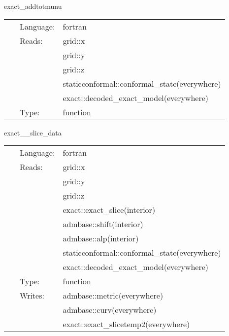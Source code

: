\vspace{5mm}


\hspace{5mm} exact\_addtotmunu 

\hspace{5mm}{\it set stress energy tansor based on exact solution } 


\hspace{5mm}

 \begin{tabular*}{160mm}{cll} 
~ & Language:  & fortran \\ 
~ & Reads:  & grid::x \\ 
~& ~ &grid::y\\ 
~& ~ &grid::z\\ 
~& ~ &staticconformal::conformal\_state(everywhere)\\ 
~& ~ &exact::decoded\_exact\_model(everywhere)\\ 
~ & Type:  & function \\ 
\end{tabular*} 


\vspace{5mm}

\noindent {\bf } 

\hspace{5mm} exact\_\_slice\_data 

\hspace{5mm}{\it  } 


\hspace{5mm}

 \begin{tabular*}{160mm}{cll} 
~ & Language:  & fortran \\ 
~ & Reads:  & grid::x \\ 
~& ~ &grid::y\\ 
~& ~ &grid::z\\ 
~& ~ &exact::exact\_slice(interior)\\ 
~& ~ &admbase::shift(interior)\\ 
~& ~ &admbase::alp(interior)\\ 
~& ~ &staticconformal::conformal\_state(everywhere)\\ 
~& ~ &exact::decoded\_exact\_model(everywhere)\\ 
~ & Type:  & function \\ 
~ & Writes:  & admbase::metric(everywhere) \\ 
~& ~ &admbase::curv(everywhere)\\ 
~& ~ &exact::exact\_slicetemp2(everywhere)\\ 
\end{tabular*} 


